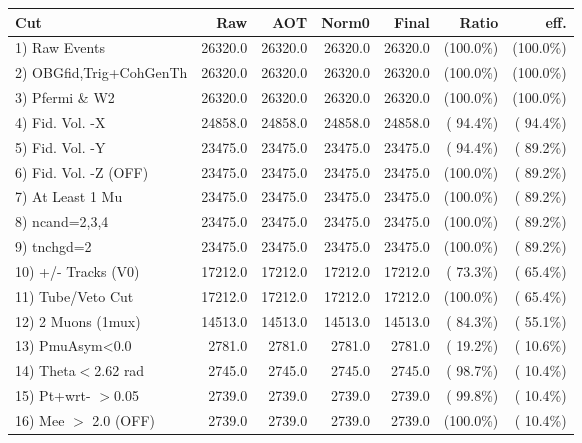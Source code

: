  \begin{table}[h!]\centering
 \begin{tabular}{||l||r|r|r|r|r|r||}
 \hline
 \hline
 Cut & Raw & AOT & Norm0 & Final & Ratio & eff.       \\
 \hline
  1) Raw Events           &      26320.0 &      26320.0 &      26320.0 &      26320.0 & (100.0\%) & (100.0\%) \\
  2) OBGfid,Trig+CohGenTh &      26320.0 &      26320.0 &      26320.0 &      26320.0 & (100.0\%) & (100.0\%) \\
  3) Pfermi \& W2         &      26320.0 &      26320.0 &      26320.0 &      26320.0 & (100.0\%) & (100.0\%) \\
  4) Fid. Vol. -X         &      24858.0 &      24858.0 &      24858.0 &      24858.0 & ( 94.4\%) & ( 94.4\%) \\
  5) Fid. Vol. -Y         &      23475.0 &      23475.0 &      23475.0 &      23475.0 & ( 94.4\%) & ( 89.2\%) \\
  6) Fid. Vol. -Z (OFF)   &      23475.0 &      23475.0 &      23475.0 &      23475.0 & (100.0\%) & ( 89.2\%) \\
  7) At Least 1 Mu        &      23475.0 &      23475.0 &      23475.0 &      23475.0 & (100.0\%) & ( 89.2\%) \\
  8) ncand=2,3,4          &      23475.0 &      23475.0 &      23475.0 &      23475.0 & (100.0\%) & ( 89.2\%) \\
  9) tnchgd=2             &      23475.0 &      23475.0 &      23475.0 &      23475.0 & (100.0\%) & ( 89.2\%) \\
 10) +/- Tracks (V0)      &      17212.0 &      17212.0 &      17212.0 &      17212.0 & ( 73.3\%) & ( 65.4\%) \\
 11) Tube/Veto Cut        &      17212.0 &      17212.0 &      17212.0 &      17212.0 & (100.0\%) & ( 65.4\%) \\
 12) 2 Muons (1mux)       &      14513.0 &      14513.0 &      14513.0 &      14513.0 & ( 84.3\%) & ( 55.1\%) \\
 13) PmuAsym<0.0          &       2781.0 &       2781.0 &       2781.0 &       2781.0 & ( 19.2\%) & ( 10.6\%) \\
 14) Theta$<$2.62 rad     &       2745.0 &       2745.0 &       2745.0 &       2745.0 & ( 98.7\%) & ( 10.4\%) \\
 15) Pt+wrt- $>$0.05      &       2739.0 &       2739.0 &       2739.0 &       2739.0 & ( 99.8\%) & ( 10.4\%) \\
 16) Mee $>$ 2.0  (OFF)   &       2739.0 &       2739.0 &       2739.0 &       2739.0 & (100.0\%) & ( 10.4\%) \\

\end{tabular}
\end{table}

